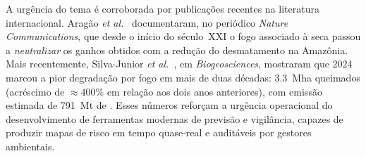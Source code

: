 %


A urgência do tema é corroborada por publicações recentes na literatura internacional. Aragão \emph{et al.}~\cite{aragao2018amazon} documentaram, no periódico \emph{Nature Communications}, que desde o início do século~XXI o fogo associado à seca passou a \emph{neutralizar} os ganhos obtidos com a redução do desmatamento na Amazônia. Mais recentemente, Silva-Junior \emph{et al.}~\cite{silvajunior2025amazon}, em \emph{Biogeosciences}, mostraram que 2024 marcou a pior degradação por fogo em mais de duas décadas: \SI{3,3}{\mega\hectare} queimados (acréscimo de \(\approx 400\%\) em relação aos dois anos anteriores), com emissão estimada de \SI{791}{\mega\tonne} de . Esses números reforçam a urgência operacional do desenvolvimento de ferramentas modernas de previsão e vigilância, capazes de produzir mapas de risco em tempo quase-real e auditáveis por gestores ambientais.


